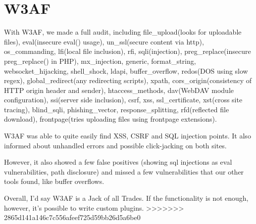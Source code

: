 \section{W3AF}
With W3AF, we made a full audit, including file\_upload(looks for uploadable files), eval(insecure eval() usage), un\_ssl(secure content via http), os\_commanding, lfi(local file inclusion), rfi, sqli(injection), preg\_replace(insecure preg\_replace() in PHP), mx\_injection, generic, format\_string, websocket\_hijacking, shell\_shock, ldapi, buffer\_overflow, redos(DOS using slow regex), global\_redirect(any redirecting scripts), xpath, cors\_origin(consistency of HTTP origin header and sender), htaccess\_methods, dav(WebDAV module configuration), ssi(server side inclusion), csrf, xss, ssl\_certificate, xst(cross site tracing), blind\_sqli, phishing\_vector, response\_splitting, rfd(reflected file download), frontpage(tries uploading files using frontpage extensions).

W3AF was able to quite easily find XSS, CSRF and SQL injection points. It also informed about unhandled errors and possible click-jacking on both sites.

However, it also showed a few false positives (showing sql injections as eval vulnerabilities, path disclosure) and missed a few vulnerabilities that our other tools found, like buffer overflows.

Overall, I'd say W3AF is a Jack of all Trades. If the functionality is not enough, however, it's possible to write custom plugins.
>>>>>>> 2865d141a146c7c556afeef725d59bb26d5a6be0
